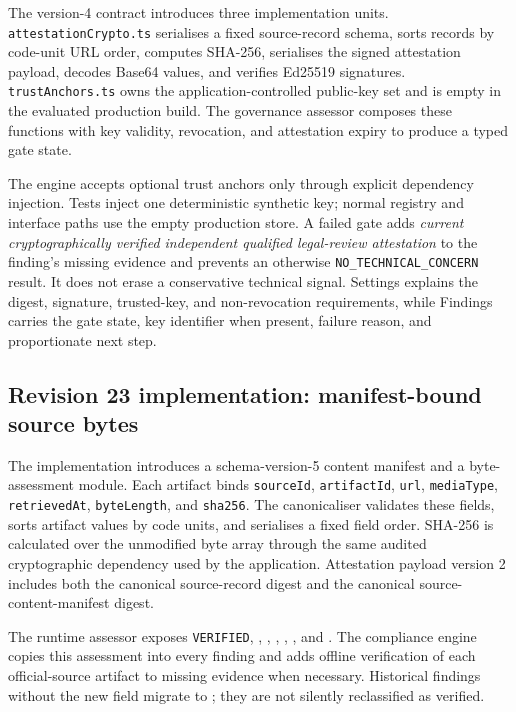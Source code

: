 The version-4 contract introduces three implementation units. \texttt{attestationCrypto.ts} serialises a fixed source-record schema, sorts records by code-unit URL order, computes SHA-256, serialises the signed attestation payload, decodes Base64 values, and verifies Ed25519 signatures. \texttt{trustAnchors.ts} owns the application-controlled public-key set and is empty in the evaluated production build. The governance assessor composes these functions with key validity, revocation, and attestation expiry to produce a typed gate state.

The engine accepts optional trust anchors only through explicit dependency injection. Tests inject one deterministic synthetic key; normal registry and interface paths use the empty production store. A failed gate adds \emph{current cryptographically verified independent qualified legal-review attestation} to the finding's missing evidence and prevents an otherwise \texttt{NO\_TECHNICAL\_CONCERN} result. It does not erase a conservative technical signal. Settings explains the digest, signature, trusted-key, and non-revocation requirements, while Findings carries the gate state, key identifier when present, failure reason, and proportionate next step.

\subsection{Revision 23 implementation: manifest-bound source bytes}

The implementation introduces a schema-version-5 content manifest and a byte-assessment module. Each artifact binds \texttt{sourceId}, \texttt{artifactId}, \texttt{url}, \texttt{mediaType}, \texttt{retrievedAt}, \texttt{byteLength}, and \texttt{sha256}. The canonicaliser validates these fields, sorts artifact values by code units, and serialises a fixed field order. SHA-256 is calculated over the unmodified byte array through the same audited cryptographic dependency used by the application. Attestation payload version 2 includes both the canonical source-record digest and the canonical source-content-manifest digest.

The runtime assessor exposes \texttt{VERIFIED}, \texttt{}, \texttt{}, \texttt{}, \texttt{}, \texttt{}, and \texttt{}. The compliance engine copies this assessment into every finding and adds offline verification of each official-source artifact to missing evidence when necessary. Historical findings without the new field migrate to \texttt{}; they are not silently reclassified as verified.

